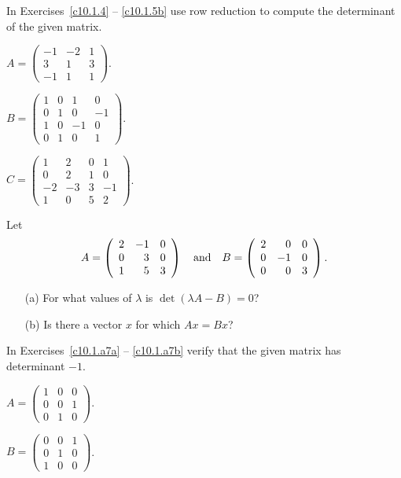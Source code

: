 \documentclass{ximera}
\begin{document}
\noindent In Exercises~\ref{c10.1.4} -- \ref{c10.1.5b} use row reduction 
to compute the determinant of the given matrix.
\begin{exercise} \label{c10.1.4}
$A = \left(\begin{array}{rrr} -1 & -2 & 1 \\ 3 & 1 & 3 \\ -1 & 1 & 1
\end{array} \right)$. 
\end{exercise}
\begin{exercise} \label{c10.1.5a}
$B = \left(\begin{array}{rrrr} 1 & 0 & 1 & 0 \\ 0 & 1 & 0 & -1 \\
1 & 0 & -1 & 0 \\ 0 & 1 & 0 & 1 \end{array}\right)$.
\end{exercise}
\begin{exercise} \label{c10.1.5b}
$C = \left(\begin{array}{rrrr} 1 & 2 & 0 & 1 \\ 0 & 2 & 1 & 0 \\
-2 & -3 & 3 & -1 \\ 1 & 0 & 5 & 2 \end{array}\right)$.
\end{exercise}

\begin{exercise} \label{c10.1.6}
Let 
\[
A = \left(\begin{array}{rrr} 2 & -1 & 0 \\ 0 & 3 & 0 \\ 1 & 5 & 3
\end{array} \right)  \quad\mbox{and}\quad
B = \left(\begin{array}{rrr} 2 & 0 & 0 \\ 0 & -1 & 0 \\ 0 & 0 & 3
\end{array} \right).
\]
\begin{itemize}
\item[(a)] For what values of $\lambda$ is  $\det(\lambda A-B)=0$?
\item[(b)] Is there a vector $x$ for which $Ax=Bx$?
\end{itemize}
\end{exercise}

\noindent In Exercises~\ref{c10.1.a7a} -- \ref{c10.1.a7b} verify 
that the given matrix has determinant $-1$.
\begin{exercise} \label{c10.1.a7a}
$A = \left( \begin{array}{rrr}
1  &  0  &  0\\
0  &  0  &  1\\
0  &  1  &  0
\end{array} \right)$.
\end{exercise}
\begin{exercise} \label{c10.1.a7b}
$B = \left( \begin{array}{rrr}
 0 &   0 &   1\\
 0 &   1 &   0\\
 1 &   0 &   0
\end{array} \right)$.
\end{exercise}
\end{document}
